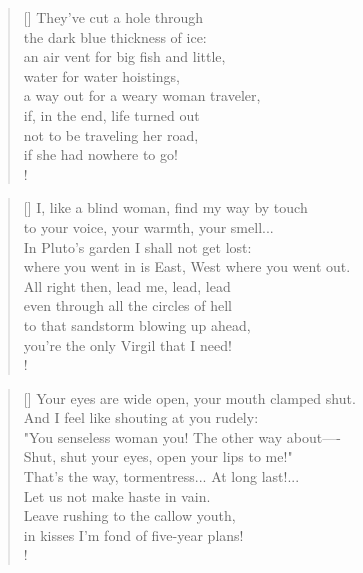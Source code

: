 \documentclass[]{article}
\begin{document}
\vspace*{0.001\textheight}
\settowidth{\versewidth}{They've cut a hole through  }
\begin{verse}[\versewidth]
They've cut a hole through\\
the dark blue thickness of ice:\\
an air vent for big fish and little,\\
water for water hoistings,\\
a way out for a weary woman traveler,\\
if, in the end, life turned out\\
not to be traveling her road,\\
if she had nowhere to go!\\!
\end{verse}
\bigskip \bigskip

\settowidth{\versewidth}{I, like a blind woman, find my way    }
\begin{verse}[\versewidth]
I, like a blind woman, find my way by touch\\
to your voice, your warmth, your smell... \\
In Pluto's garden I shall not get lost:\\
where you went in is East, West where you went out.\\
All right then, lead me, lead, lead\\
even through all the circles of hell\\
to that sandstorm blowing up ahead,\\
you're the only Virgil that I need!\\!
\end{verse}
\bigskip \bigskip

\settowidth{\versewidth}{Your eyes are wide open, your mouth}
\begin{verse}[\versewidth]
Your eyes are wide open, your mouth clamped shut.\\
And I feel like shouting at you rudely:\\
"You senseless woman you! The other way about—- \\
Shut, shut your eyes, open your lips to me!"\\
That's the way, tormentress... At long last!...\\
Let us not make haste in vain.\\
Leave rushing to the callow youth,\\
in kisses I'm fond of five-year plans!\\!
\end{verse}
\newpage
\end{document}
